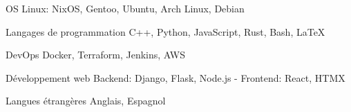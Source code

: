 

\begin{cvskills}


  \cvskill
    {OS} %
    {Linux: NixOS, Gentoo, Ubuntu, Arch Linux, Debian} %

  \cvskill
    {Langages de programmation} %
    {C++, Python, JavaScript, Rust, Bash, LaTeX}

  \cvskill
    {DevOps} %
    {Docker, Terraform, Jenkins, AWS} %

  \cvskill
    {Développement web} %
    {Backend: Django, Flask, Node.js - Frontend: React, HTMX} %

  \cvskill
    {Langues étrangères} %
    {Anglais, Espagnol} %

\end{cvskills}
